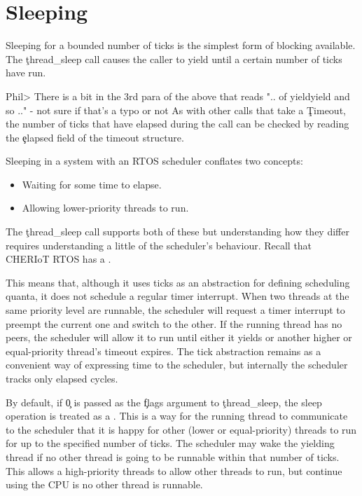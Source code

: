 \section{Sleeping}

Sleeping for a bounded number of ticks is the simplest form of blocking available.
The \c{thread_sleep} call causes the caller to yield until a certain number of ticks have run.

Phil> There is a bit in the 3rd para of the above that reads ".. of yieldyield and so .." - not sure if that's a typo or not
As with other calls that take a \c{Timeout}, the number of ticks that have elapsed during the call can be checked by reading the \c{elapsed} field of the timeout structure.

Sleeping in a system with an RTOS scheduler conflates two concepts:

\begin{itemize}
	\item{Waiting for some time to elapse.}
	\item{Allowing lower-priority threads to run.}
\end{itemize}

The \c{thread_sleep} call supports both of these but understanding how they differ requires understanding a little of the scheduler's behaviour.
Recall that CHERIoT RTOS has a .

This means that, although it uses ticks as an abstraction for defining scheduling quanta, it does not schedule a regular timer interrupt.
When two threads at the same priority level are runnable, the scheduler will request a timer interrupt to preempt the current one and switch to the other.
If the running thread has no peers, the scheduler will allow it to run until either it yields or another higher or equal-priority thread's timeout expires.
The tick abstraction remains as a convenient way of expressing time to the scheduler, but internally the scheduler tracks only elapsed cycles.

By default, if \c{0} is passed as the \c{flags} argument to \c{thread_sleep}, the sleep operation is treated as a .
This is a way for the running thread to communicate to the scheduler that it is happy for other (lower or equal-priority) threads to run for up to the specified number of ticks.
The scheduler may wake the yielding thread if no other thread is going to be runnable within that number of ticks.
This allows a high-priority threads to allow other threads to run, but continue using the CPU is no other thread is runnable.


